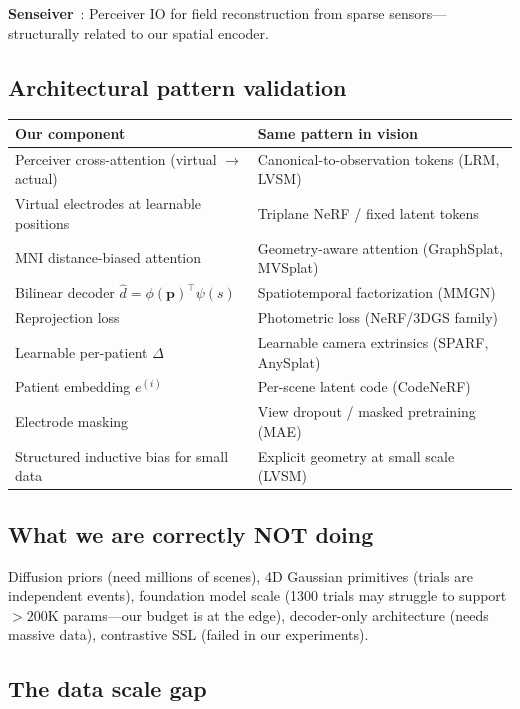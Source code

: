 \documentclass[11pt,letterpaper]{article}
\newcommand{\bfp}{\mathbf{p}}
\begin{document}
\textbf{Senseiver}~\cite{jha2023}: Perceiver IO for field reconstruction from sparse sensors---structurally related to our spatial encoder.

\subsection{Architectural pattern validation}

\begin{table}[ht!]\centering\small
\begin{tabular}{@{}p{}p{}@{}}
\toprule
\textbf{Our component} & \textbf{Same pattern in vision} \\
\midrule
Perceiver cross-attention (virtual $\to$ actual) & Canonical-to-observation tokens (LRM, LVSM) \\
Virtual electrodes at learnable positions & Triplane NeRF / fixed latent tokens \\
MNI distance-biased attention & Geometry-aware attention (GraphSplat, MVSplat) \\
Bilinear decoder $\hat{d} = \phi(\bfp)^\top\psi(s)$ & Spatiotemporal factorization (MMGN) \\
Reprojection loss & Photometric loss (NeRF/3DGS family) \\
Learnable per-patient $\Delta$ & Learnable camera extrinsics (SPARF, AnySplat) \\
Patient embedding $e^{(i)}$ & Per-scene latent code (CodeNeRF) \\
Electrode masking & View dropout / masked pretraining (MAE) \\
Structured inductive bias for small data & Explicit geometry at small scale (LVSM) \\
\bottomrule
\end{tabular}
\end{table}

\subsection{What we are correctly NOT doing}

Diffusion priors (need millions of scenes), 4D Gaussian primitives (trials are independent events), foundation model scale (1300 trials may struggle to support ${>}200$K params---our budget is at the edge), decoder-only architecture (needs massive data), contrastive SSL (failed in our experiments).

\subsection{The data scale gap}
\end{document}
